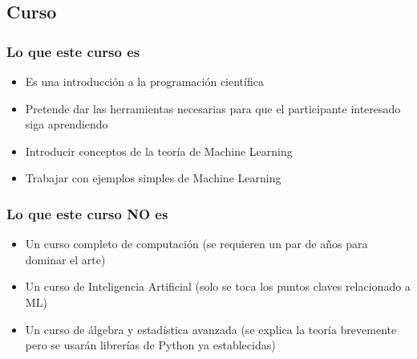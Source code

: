 \documentclass[10pt]{beamer}
\begin{document}
\subsection{Curso}
\begin{frame}
\frametitle{Lo que este curso es}

\begin{beamerboxesrounded}[upper=uppercolor, lower=lowercolor, shadow=true]{} 

\begin{itemize}
 \item Es una introducci\'on a la programaci\'on cient\'ifica
 \item Pretende dar las herramientas necesarias para que el participante interesado siga aprendiendo
 \item Introducir conceptos de la teor\'ia de Machine Learning
 \item Trabajar con ejemplos simples de Machine Learning
\end{itemize}
\end{beamerboxesrounded}

\end{frame}


\begin{frame}
\frametitle{Lo que este curso NO es}

\begin{beamerboxesrounded}[upper=uppercolor, lower=lowercolor, shadow=true]{} 

\begin{itemize}
 \item Un curso completo de computaci\'on (se requieren un par de a\~nos para dominar el arte)
 \item Un curso de Inteligencia Artificial (solo se toca los puntos claves relacionado a ML)
 \item Un curso de \'algebra y estad\'istica avanzada (se explica la teor\'ia brevemente pero se usar\'an librer\'ias de Python ya establecidas)
\end{itemize}
\end{beamerboxesrounded}

\end{frame}
\end{document}
